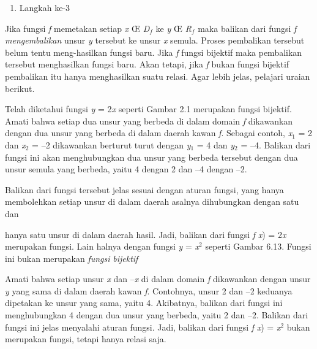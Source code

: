 \documentclass[11pt,fleqn]{book} %
\begin{document}
\noindent 

\begin{enumerate}
\item  Langkah ke-3
\end{enumerate}

Jika fungsi \textit{f} memetakan setiap \textit{x} {\OE} \textit{D${}_{f}$} ke \textit{y} {\OE} \textit{R${}_{f}$} maka balikan dari fungsi \textit{f} \textit{mengembalikan} unsur \textit{y} tersebut ke unsur \textit{x }semula. Proses pembalikan tersebut belum tentu meng-hasilkan fungsi baru. Jika \textit{f} fungsi bijektif maka pembalikan tersebut menghasilkan fungsi baru. Akan tetapi, jika \textit{f} bukan fungsi bijektif pembalikan itu hanya menghasilkan suatu relasi. Agar lebih jelas, pelajari uraian berikut.

Telah diketahui fungsi \textit{y} = 2\textit{x} seperti Gambar 2.1 merupakan fungsi bijektif. Amati bahwa setiap dua unsur yang berbeda di dalam domain \textit{f} dikawankan dengan dua unsur yang berbeda di dalam daerah kawan \textit{f}. Sebagai contoh, \textit{x}${}_{1}$ = 2 dan \textit{x}${}_{2}$ = --2 dikawankan berturut turut dengan \textit{y}${}_{1}$ = 4 dan \textit{y}${}_{2}$ = --4. Balikan dari fungsi ini akan menghubungkan dua unsur yang berbeda tersebut dengan dua unsur semula yang berbeda, yaitu 4 dengan 2 dan --4 dengan --2.

Balikan dari fungsi tersebut jelas sesuai dengan aturan fungsi, yang hanya membolehkan setiap unsur di dalam daerah asalnya dihubungkan dengan satu dan 

hanya satu unsur di dalam daerah hasil. Jadi, balikan dari fungsi \textit{f} \textit{x}) = 2\textit{x} merupakan fungsi. Lain halnya dengan fungsi \textit{y} = \textit{x}${}^{2}$ seperti Gambar 6.13. Fungsi ini bukan merupakan \textit{fungsi} \textit{bijektif}

\noindent 

Amati bahwa setiap unsur \textit{x} dan --\textit{x} di dalam domain \textit{f }dikawankan dengan unsur\textit{ y }yang\textit{ }sama di dalam daerah\textit{ }kawan \textit{f}. Contohnya, unsur 2 dan --2 keduanya dipetakan ke unsur yang sama, yaitu 4. Akibatnya, balikan dari fungsi ini menghubungkan 4 dengan dua unsur yang berbeda, yaitu 2 dan --2. Balikan dari fungsi ini jelas menyalahi aturan fungsi. Jadi, balikan dari fungsi \textit{f} \textit{x}) = \textit{x}${}^{2}$ bukan merupakan fungsi, tetapi hanya relasi saja.



\noindent \textit{}
\end{document}

